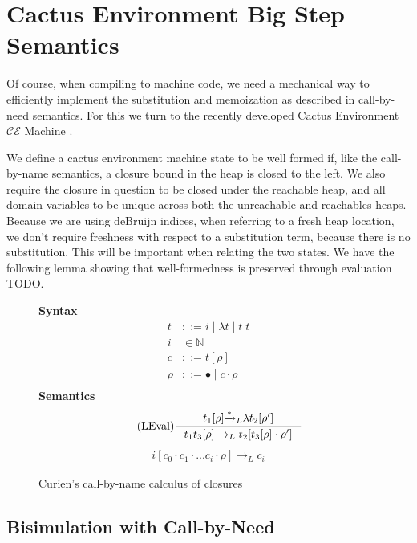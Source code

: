 \section{Cactus Environment Big Step Semantics}

Of course, when compiling to machine code, we need a mechanical way to
efficiently implement the substitution and memoization as described in
call-by-need semantics. For this we turn to the recently developed Cactus
Environment $\mathcal{CE}$ Machine \cite{?}. 

We define a cactus environment machine state to be well formed if, like the
call-by-name semantics, a closure bound in the heap is closed to the left.
We also require the closure in question to be closed under the reachable heap,
and all domain variables to be unique across both the unreachable and reachables
heaps. Because we are using deBruijn indices, when referring to a fresh heap
location, we don't require freshness with respect to a substitution term,
because there is no substitution. This will be important when relating the two
states. We have the following lemma showing that well-formedness is preserved
through evaluation TODO.

\begin{figure}
\textbf{Syntax}
\begin{align*}
\tag{Term} t &::= i \; | \; \lambda t \; | \; t \; t  \\
\tag{Variable} i &\in \mathbb{N}  \\
\tag{Closure} c &::= t [\rho] \\
\tag{Environment} \rho &::= \bullet \; | \; c \cdot \rho \\
\end{align*}
\textbf{Semantics}
\begin{align*}
\tag{LEval}\inference
{t_1[\rho] {\xrightarrow{* }}_L \lambda t_2[\rho'] }
{t_1 t_3[\rho] \rightarrow_L t_2[t_3[\rho] \cdot \rho'] } 
\end{align*}
\begin{align*}
\tag{LVar} i [c_0 \cdot c_1 \cdot ... c_i \cdot \rho] \rightarrow_L c_i
\end{align*}
\caption{Curien's call-by-name calculus of closures ~\cite{curien1991abstract}}
\label{fig:calcclos}
\end{figure}

\subsection{Bisimulation with Call-by-Need}

